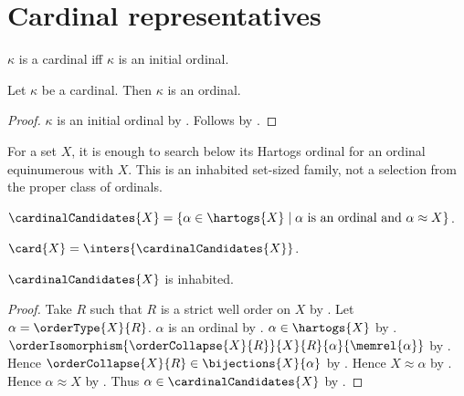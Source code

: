 

\section{Cardinal representatives}

\begin{definition}\label{cardinal}
    $\kappa$ is a cardinal iff $\kappa$ is an initial ordinal.
\end{definition}

\begin{proposition}\label{cardinal_is_ordinal}
    Let $\kappa$ be a cardinal.
    Then $\kappa$ is an ordinal.
\end{proposition}
\begin{proof}
    $\kappa$ is an initial ordinal by .
    Follows by .
\end{proof}

For a set $X$, it is enough to search below its Hartogs ordinal for an
ordinal equinumerous with $X$.  This is an inhabited set-sized family, not a
selection from the proper class of ordinals.

\begin{definition}\label{cardinal_candidates}
    $\cardinalCandidates{X}
        =\{\alpha\in\hartogs{X}\mid
            \text{$\alpha$ is an ordinal and $\alpha\approx X$}\}$.
\end{definition}

\begin{definition}\label{card}
    $\card{X}=\inters{\cardinalCandidates{X}}$.
\end{definition}

\begin{proposition}\label{cardinal_candidates_inhabited}
    $\cardinalCandidates{X}$ is inhabited.
\end{proposition}
\begin{proof}
    Take $R$ such that $R$ is a strict well order on $X$
        by .
    Let $\alpha=\orderType{X}{R}$.
    $\alpha$ is an ordinal by .
    $\alpha\in\hartogs{X}$
        by .
    $\orderIsomorphism{\orderCollapse{X}{R}}
        {X}{R}{\alpha}{\memrel{\alpha}}$
        by .
    Hence $\orderCollapse{X}{R}\in\bijections{X}{\alpha}$
        by .
    Hence $X\approx\alpha$ by .
    Hence $\alpha\approx X$ by .
    Thus $\alpha\in\cardinalCandidates{X}$
        by .
\end{proof}

